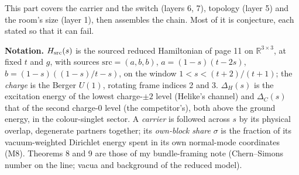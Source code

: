 \newpage
{}

This part covers the carrier and the switch (layers 6, 7), topology (layer 5) and the room's size (layer 1), then
assembles the chain. Most of it is conjecture, each stated so that it can fail.

\textbf{Notation.} $H_{\rm src}(s)$ is the sourced reduced Hamiltonian of page 11 on $\mathbb R^{3\times3}$, at fixed
$t$ and $g$, with sources $\mathrm{src}=(a,b,b)$, $a=(1-s)(t-2s)$, $b=(1-s)((1-s)/t-s)$, on the window
$1<s<(t+2)/(t+1)$; the \emph{charge} is the Berger $U(1)$, rotating frame indices 2 and 3. $\Delta_H(s)$ is the
excitation energy of the lowest charge-$\pm2$ level (Helike's channel) and $\Delta_C(s)$ that of the second charge-0
level (the competitor's), both above the ground energy, in the colour-singlet sector. A \emph{carrier} is followed
across $s$ by its physical overlap, degenerate partners together; its \emph{own-block share} $\sigma$ is the fraction
of its vacuum-weighted Dirichlet energy spent in its own normal-mode coordinates (M8). Theorems 8 and 9 are those of
my bundle-framing note (Chern--Simons number on the line; vacua and background of the reduced model).

\medskip{}

